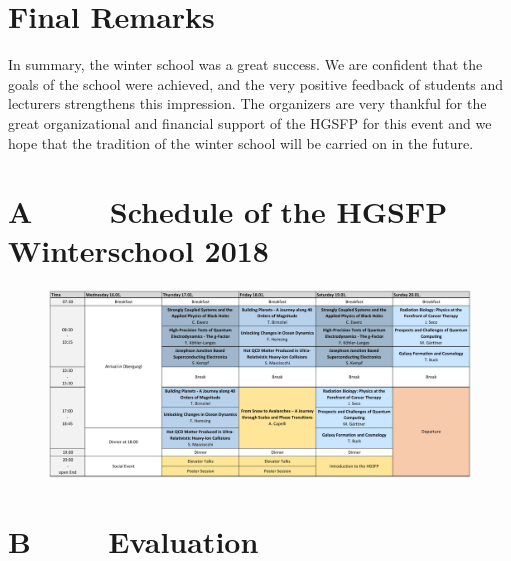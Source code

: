 \newpage


%

\section*{Final Remarks}
In summary, the winter school was a great success. We are confident that the goals of the school were achieved, and the very positive feedback of students and lecturers strengthens this impression. The organizers are very thankful for the great organizational and financial support of the HGSFP for this event and we hope that the tradition of the winter school will be carried on in the future.




\newpage
\abstract
\section*{A $\qquad$ Schedule of the HGSFP Winterschool 2018}

\begin{figure}[h!]
\centering
\includegraphics[scale=0.66, angle = 90 ]{figures/Program.jpg}
\end{figure}


\section*{B $\qquad$ Evaluation}

\newpage
